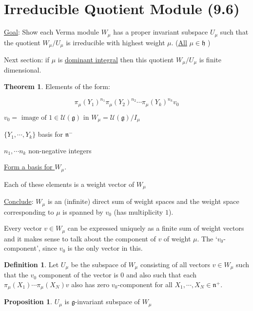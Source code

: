 \documentclass{article}
\theoremstyle{definition}
\newtheorem{definition}{Definition}
\newtheorem{theorem}{Theorem}
\newtheorem{proposition}{Proposition}
\begin{document}
\section*{Irreducible Quotient Module (9.6)}

\underline{Goal}: Show each Verma module \(W_\mu\) has a proper invariant subspace \(U_\mu \) such that the quotient \(W_\mu / U_\mu\) is irreducible with highest weight \(\mu\). (\underline{All} \(\mu \in \mathfrak{h}\) )

Next section: if \(\mu\) is \underline{dominant integral} then this quotient \(W_\mu / U_\mu\) is finite dimensional.  

\begin{theorem}
    Elements of the form:

    \[
        \pi_\mu (Y_1)^{n_1} \pi_\mu(Y_2)^{n_2}\cdots \pi_\mu(Y_k)^{n_k}v_0
    \]

    \(v_0 = \text{ image of } 1\in \mathcal{U}(\mathfrak{g}) \text{ in } W_\mu = \mathcal{U}(\mathfrak{g}) / I_\mu\)

    \(\{ Y_1,\cdots, Y_k \} \) basis for \(\mathfrak{n}^-\)
    
    \(n_1,\cdots n_k\) non-negative integers

    \underline{Form a basis for \(W_\mu\)}.
    
    Each of these elements is a weight vector of \(W_\mu \)
    
    \underline{Conclude}: \(W_\mu\) is an (infinite) direct sum of weight spaces and the weight space corresponding to \(\mu\) is spanned by \(v_0\) (has multiplicity \(1\)).   
\end{theorem}

Every vector \(v\in W_\mu\) can be expressed uniquely as a finite sum of weight vectors and it makes sense to talk about the component of \(v\) of weight \(\mu\). The `\(v_0\)- component', since \(v_0\) is the only vector in this.

\begin{definition}
    Let \(U_\mu\) be the subspace of \(W_\mu\) consisting of all vectors \(v\in W_{\mu}\) such that the \(v_0\) component of the vector is \(0\) and also such that each \(\pi_\mu(X_1)\cdots \pi_\mu(X_N)v\) also has zero \(v_0\)-component for all \(X_1,\cdots,X_N \in \mathfrak{n}^+\).     
\end{definition}

\begin{proposition}
    \(U_\mu\) is \(\mathfrak{g}\)-invariant subspace of \(W_\mu\)    
\end{proposition}
\end{document}
